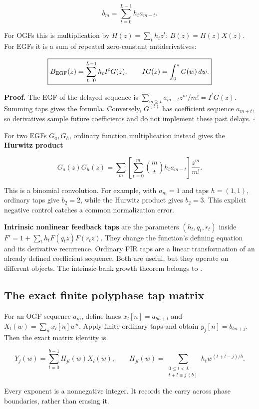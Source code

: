 \[
b_m=\sum_{t=0}^{L-1}h_ta_{m-t}.
\]

For OGFs this is multiplication by \(H(z)=\sum_th_tz^t\):
\(B(z)=H(z)X(z)\). For EGFs it is a sum of repeated zero-constant
antiderivatives:

\[
\boxed{B_{\rm EGF}(z)=\sum_{t=0}^{L-1}h_t I^tG(z),\qquad
IG(z)=\int_0^zG(w)\,dw.}
\]

\textbf{Proof.} The EGF of the delayed sequence is
\(\sum_{m\ge t}a_{m-t}z^m/m!=I^tG(z)\). Summing taps gives the formula.
Conversely, \(G^{(t)}\) has coefficient sequence \(a_{m+t}\), so
derivatives sample future coefficients and do not implement these past
delays. \(\square\)

For two EGFs \(G_a,G_h\), ordinary function multiplication instead gives
the \textbf{Hurwitz product}

\[
G_a(z)G_h(z)=\sum_m\left[
\sum_{t=0}^m\binom mt h_ta_{m-t}\right]\frac{z^m}{m!}.
\]

This is a binomial convolution. For example, with \(a_m=1\) and taps
\(h=(1,1)\), ordinary taps give \(b_2=2\), while the Hurwitz product
gives \(b_2=3\). This explicit negative control catches a common
normalization error.

\textbf{Intrinsic nonlinear feedback taps} are the parameters
\((h_t,q_t,r_t)\) inside \(F'=1+\sum_th_tF(q_tz)F(r_tz)\). They change
the function's defining equation and its derivative recurrence. Ordinary
FIR taps are a linear transformation of an already defined coefficient
sequence. Both are useful, but they operate on different objects. The
intrinsic-bank growth theorem belongs to
.

\hypertarget{the-exact-finite-polyphase-tap-matrix}{%
\subsection{The exact finite polyphase tap
matrix}\label{the-exact-finite-polyphase-tap-matrix}}

For an OGF sequence \(a_m\), define lanes \(x_l[n]=a_{bn+l}\) and
\(X_l(w)=\sum_nx_l[n]w^n\). Apply finite ordinary taps and obtain
\(y_j[n]=b_{bn+j}\). Then the exact matrix identity is

\[
\boxed{Y_j(w)=\sum_{l=0}^{b-1}H_{jl}(w)X_l(w),\qquad
H_{jl}(w)=\sum_{\substack{0\le t<L\\t+l\equiv j\,(b)}}
h_t w^{(t+l-j)/b}.}
\]

Every exponent is a nonnegative integer. It records the carry across
phase boundaries, rather than erasing it.

